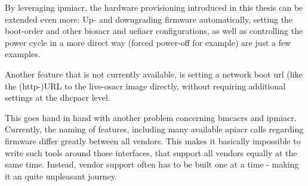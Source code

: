 By leveraging \gls{ipmiacr}, the hardware provisioning introduced in this thesis can be extended even more: Up- and downgrading firmware automatically, setting the boot-order and other \gls{biosacr} and \gls{uefiacr} configurations, as well as controlling the power cycle in a more direct way (forced power-off for example) are just a few examples. 

Another feature that is not currently available, is setting a network boot url (like the (http-)URL to the live-\gls{osacr} image directly, without requiring additional settings at the \gls{dhcpacr} level.

This goes hand in hand with another problem concerning \gls{bmcacr}s and \gls{ipmiacr}. Currently, the naming of features, including many available \gls{apiacr} calls regarding firmware differ greatly between all vendors. This makes it basically impossible to write such tools around those interfaces, that support all vendors equally at the same time. Instead, vendor support often has to be built one at a time - making it an quite unpleasant journey.




